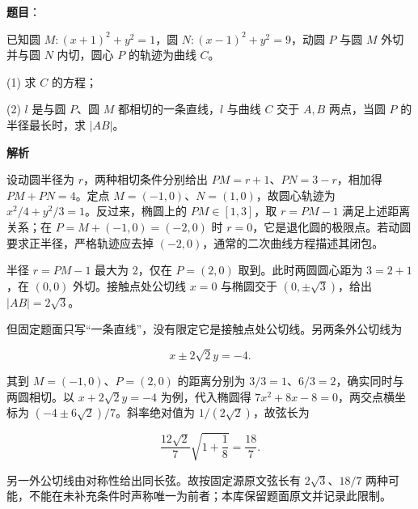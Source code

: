 \begin{answer}

\textbf{题目}：

已知圆 $M:(x+1)^2+y^2=1$，圆 $N:(x-1)^2+y^2=9$，动圆 $P$ 与圆 $M$ 外切并与圆 $N$ 内切，圆心 $P$ 的轨迹为曲线 $C$。

(1) 求 $C$ 的方程；

(2) $l$ 是与圆 $P$、圆 $M$ 都相切的一条直线，$l$ 与曲线 $C$ 交于 $A,B$ 两点，当圆 $P$ 的半径最长时，求 $|AB|$。

\textbf{解析}


设动圆半径为 $r$，两种相切条件分别给出 $PM=r+1$、$PN=3-r$，相加得 $PM+PN=4$。定点 $M=(-1,0)$、$N=(1,0)$，故圆心轨迹为 $x^2/4+y^2/3=1$。反过来，椭圆上的 $PM\in[1,3]$，取 $r=PM-1$ 满足上述距离关系；在 $P=M+(-1,0)=(-2,0)$ 时 $r=0$，它是退化圆的极限点。若动圆要求正半径，严格轨迹应去掉 $(-2,0)$，通常的二次曲线方程描述其闭包。


半径 $r=PM-1$ 最大为 $2$，仅在 $P=(2,0)$ 取到。此时两圆圆心距为 $3=2+1$，在 $(0,0)$ 外切。接触点处公切线 $x=0$ 与椭圆交于 $(0,\pm\sqrt3)$，给出 $|AB|=2\sqrt3$。

但固定题面只写“一条直线”，没有限定它是接触点处公切线。另两条外公切线为

\nopagebreak[4]
\[
x\pm2\sqrt2y=-4.
\]

其到 $M=(-1,0)$、$P=(2,0)$ 的距离分别为 $3/3=1$、$6/3=2$，确实同时与两圆相切。以 $x+2\sqrt2y=-4$ 为例，代入椭圆得 $7x^2+8x-8=0$，两交点横坐标为 $(-4\pm6\sqrt2)/7$。斜率绝对值为 $1/(2\sqrt2)$，故弦长为

\nopagebreak[4]
\[
\frac{12\sqrt2}7\sqrt{1+\frac18}=\frac{18}7.
\]

另一外公切线由对称性给出同长弦。故按固定源原文弦长有 $2\sqrt3$、$18/7$ 两种可能，不能在未补充条件时声称唯一为前者；本库保留题面原文并记录此限制。



\end{answer}
